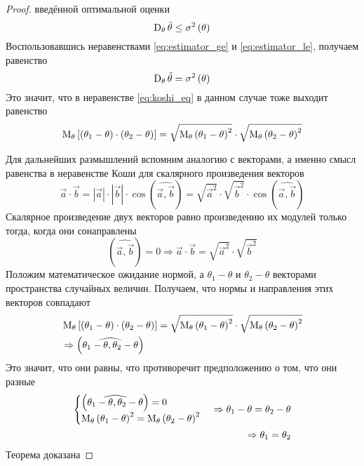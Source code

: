 \begin{proof}
  введённой оптимальной оценки
  \begin{equation}\label{eq:estimator_le}
    \operatorname{D}_{\theta} \tilde{\theta}\le\sigma^2\left(\theta\right)
  \end{equation}
  Воспользовавшись неравенствами
  \eqref{eq:estimator_ge} и \eqref{eq:estimator_le}, получаем равенство
  $$\operatorname{D}_{\theta} \tilde{\theta}=\sigma^2\left(\theta\right)$$
  Это значит, что в неравенстве \eqref{eq:koshi_eq}
  в данном случае тоже выходит равенство
  $$\operatorname{M}_{\theta} \left[ \left( \theta_1-\theta \right)
      \cdot\left( \theta_2-\theta \right) \right]
    =\sqrt{\operatorname{M}_{\theta} \left( \theta_1-\theta \right)^2}
      \cdot\sqrt{\operatorname{M}_{\theta} \left( \theta_2-\theta \right)^2}$$

  Для дальнейших размышлений вспомним аналогию с векторами,
  а именно смысл равенства в неравенстве Коши
  для скалярного произведения векторов
  $$\vec{a}\cdot\vec{b}
    =\left|\vec{a}\right|\cdot\left|\vec{b}\right|
      \cdot\cos{\left(\widehat{\vec{a},\vec{b}}\right)}
    =\sqrt{\vec{a}^2}\cdot\sqrt{\vec{b}^2}
      \cdot\cos{\left(\widehat{\vec{a},\vec{b}}\right)}$$
  Скалярное произведение двух векторов равно произведению их модулей
  только тогда, когда они сонаправлены
  $$\left(\widehat{\vec{a},\vec{b}}\right)=0
    \Rightarrow \vec{a}\cdot\vec{b}
    =\sqrt{\vec{a}^2}\cdot\sqrt{\vec{b}^2}$$
  Положим математическое ожидание нормой,
  а $\theta_1-\theta$ и $\theta_2-\theta$ векторами
  пространства случайных величин.
  Получаем, что нормы и направления этих векторов совпадают
  \begin{align*}
    &\operatorname{M}_{\theta} \left[ \left( \theta_1-\theta \right)
      \cdot\left( \theta_2-\theta \right) \right]
    =\sqrt{\operatorname{M}_{\theta} \left( \theta_1-\theta \right)^2}
      \cdot\sqrt{\operatorname{M}_{\theta} \left( \theta_2-\theta \right)^2}\\
    &\Rightarrow\left(\widehat{\theta_1-\theta,\theta_2-\theta}\right)\\
    \end{align*}
  Это значит, что они равны,
  что противоречит предположению о том, что они разные
  \begin{align*}
    \begin{cases}
      \left(\widehat{\theta_1-\theta,\theta_2-\theta}\right)=0\\
      \operatorname{M}_{\theta} \left( \theta_1-\theta \right)^2
        =\operatorname{M}_{\theta} \left( \theta_2-\theta \right)^2
    \end{cases}
    \Rightarrow \theta_1-\theta=\theta_2-\theta\\
    \Rightarrow\theta_1=\theta_2
  \end{align*}
  Теорема доказана
\end{proof}

